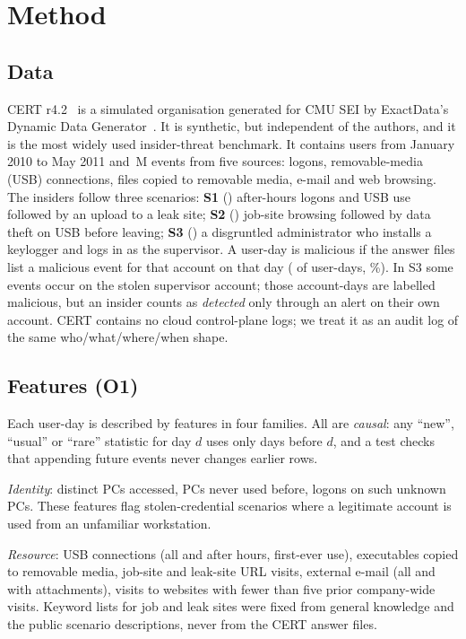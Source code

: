 \documentclass[conference]{IEEEtran}
\begin{document}
\section{Method}
\subsection{Data}
CERT r4.2~\cite{lindauer2020cert} is a simulated organisation generated for CMU SEI by ExactData's
Dynamic Data Generator~\cite{glasser2013bridging}. It is synthetic, but independent of the
authors, and it is the most widely used insider-threat benchmark. It contains \NUsers{} users from
January 2010 to May 2011 and \NEvents{}\,M events from five sources: logons, removable-media
(USB) connections, files copied to removable media, e-mail and web browsing. The \NInsiders{}
insiders follow three scenarios: \textbf{S1} (\NInsSOne{}) after-hours logons and USB use followed by
an upload to a leak site; \textbf{S2} (\NInsSTwo{}) job-site browsing followed by data theft on USB
before leaving; \textbf{S3} (\NInsSThree{}) a disgruntled administrator who installs a keylogger and
logs in as the supervisor. A user-day is malicious if the answer files list a malicious event for
that account on that day (\NMalDays{} of \NUserDays{} user-days, \PosRate\%). In S3 some events
occur on the stolen supervisor account; those account-days are labelled malicious, but an insider
counts as \emph{detected} only through an alert on their own account. CERT contains no cloud
control-plane logs; we treat it as an audit log of the same who/what/where/when shape.

\subsection{Features (O1)}
Each user-day is described by \NFeatures{} features in four families. All are \emph{causal}: any
``new'', ``usual'' or ``rare'' statistic for day $d$ uses only days before $d$, and a test checks
that appending future events never changes earlier rows.

\emph{Identity}: distinct PCs accessed, PCs never used before, logons on such unknown PCs. These
features flag stolen-credential scenarios where a legitimate account is used from an unfamiliar
workstation.

\emph{Resource}: USB connections (all and after hours, first-ever use), executables copied to
removable media, job-site and leak-site URL visits, external e-mail (all and with attachments),
visits to websites with fewer than five prior company-wide visits. Keyword lists for job and leak
sites were fixed from general knowledge and the public scenario descriptions, never from the
CERT answer files.
\end{document}
